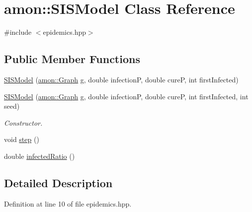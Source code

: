 \hypertarget{classamon_1_1_s_i_s_model}{\section{amon\-:\-:S\-I\-S\-Model Class Reference}
\label{classamon_1_1_s_i_s_model}
}


{\ttfamily \#include $<$epidemics.\-hpp$>$}

\subsection*{Public Member Functions}
\begin{DoxyCompactItemize}
\item 
\hyperlink{classamon_1_1_s_i_s_model_ac689fbd6cf5c95e15514957dac07d501}{S\-I\-S\-Model} (\hyperlink{classamon_1_1_graph}{amon\-::\-Graph} g, double infection\-P, double cure\-P, int first\-Infected)
\item 
\hyperlink{classamon_1_1_s_i_s_model_a780e14829a8ffbdc793267348e99673e}{S\-I\-S\-Model} (\hyperlink{classamon_1_1_graph}{amon\-::\-Graph} g, double infection\-P, double cure\-P, int first\-Infected, int seed)
\begin{DoxyCompactList}\small\item\em Constructor. \end{DoxyCompactList}\item 
void \hyperlink{classamon_1_1_s_i_s_model_af5618b91dfd41f363c651723a9a93362}{step} ()
\item 
double \hyperlink{classamon_1_1_s_i_s_model_ac88cd70fc1ee45826422803be10fbf8a}{infected\-Ratio} ()
\end{DoxyCompactItemize}


\subsection{Detailed Description}


Definition at line 10 of file epidemics.\-hpp.



